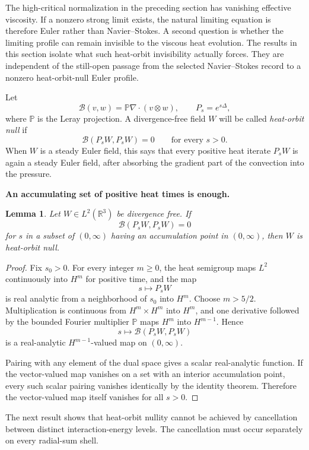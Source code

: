 \documentclass[11pt]{article}
\newtheorem{lemma}[theorem]{Lemma}
\theoremstyle{definition}\newtheorem{problem}[theorem]{Problem}
\theoremstyle{definition}
\theoremstyle{remark}
\newcommand{\R}{\mathbb R}
\begin{document}
The high-critical normalization in the preceding section has vanishing effective
viscosity.  If a nonzero strong limit exists, the natural limiting equation is
therefore Euler rather than Navier--Stokes.  A second question is whether the
limiting profile can remain invisible to the viscous heat evolution.  The
results in this section isolate what such heat-orbit invisibility actually
forces.  They are independent of the still-open passage from the selected
Navier--Stokes record to a nonzero heat-orbit-null Euler profile.

Let
\[
 \mathcal B(v,w)=\mathbb P\nabla\!\cdot(v\otimes w),
 \qquad P_s=e^{s\Delta},
\]
where \(\mathbb P\) is the Leray projection.  A divergence-free field \(W\) will
be called \emph{heat-orbit null} if
\[
 \mathcal B(P_sW,P_sW)=0
 \qquad\text{for every }s>0.
\]
When \(W\) is a steady Euler field, this says that every positive heat iterate
\(P_sW\) is again a steady Euler field, after absorbing the gradient part of
the convection into the pressure.

\medskip
\noindent\textbf{An accumulating set of positive heat times is enough.}
\begin{lemma}\label{lem:heat-analyticity}
Let \(W\in L^2(\R^3)\) be divergence free.  If
\[
 \mathcal B(P_sW,P_sW)=0
\]
for \(s\) in a subset of \((0,\infty)\) having an accumulation point in
\((0,\infty)\), then \(W\) is heat-orbit null.
\end{lemma}

\begin{proof}
Fix \(s_0>0\).  For every integer \(m\ge0\), the heat semigroup maps \(L^2\)
continuously into \(H^m\) for positive time, and the map
\[
 s\longmapsto P_sW
\]
is real analytic from a neighborhood of \(s_0\) into \(H^m\).  Choose
\(m>5/2\).  Multiplication is continuous from \(H^m\times H^m\) into \(H^m\),
and one derivative followed by the bounded Fourier multiplier \(\mathbb P\)
maps \(H^m\) into \(H^{m-1}\).  Hence
\[
 s\longmapsto \mathcal B(P_sW,P_sW)
\]
is a real-analytic \(H^{m-1}\)-valued map on \((0,\infty)\).

Pairing with any element of the dual space gives a scalar real-analytic
function.  If the vector-valued map vanishes on a set with an interior
accumulation point, every such scalar pairing vanishes identically by the
identity theorem.  Therefore the vector-valued map itself vanishes for all
\(s>0\).
\end{proof}

The next result shows that heat-orbit nullity cannot be achieved by cancellation
between distinct interaction-energy levels.  The cancellation must occur
separately on every radial-sum shell.
\end{document}
